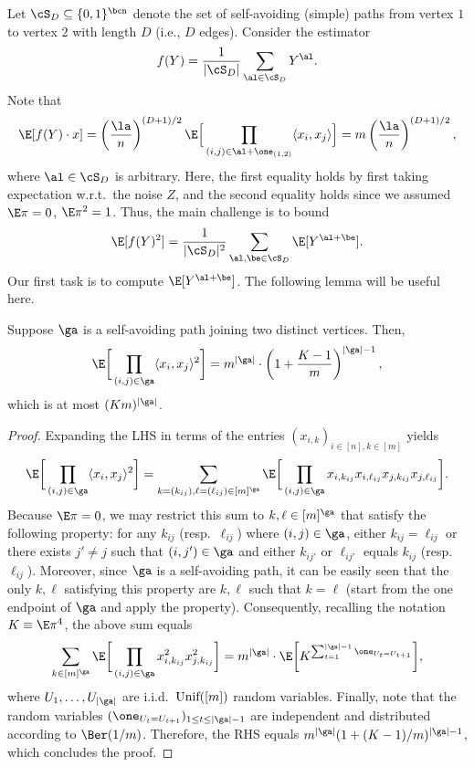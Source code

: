 \documentclass[11pt]{article}
\begin{document}
Let $\cS_D\subseteq \{0,1\}^{\bcn}$ denote the set of self-avoiding (simple) paths from vertex $1$ to vertex $2$ with length $D$ (i.e., $D$ edges). Consider the estimator
\begin{equation}\label{eq:f:saw}
f(Y)=\frac{1}{|\cS_D|}\sum_{\al \in \cS_D} Y^{\al}.
\end{equation}
Note that
\[
\E[f(Y)\cdot x]=\left(\frac{\la}{n}\right)^{(D+1)/2}\E\Big[\prod_{(i,j)\in \al+\one_{(1,2)}}\langle x_i,x_j\rangle\Big]=m\left(\frac{\la}{n}\right)^{(D+1)/2},
\]
where $\al\in \cS_D$ is arbitrary. Here, the first equality holds by first taking expectation w.r.t.\ the noise $Z$, and the second equality holds since we assumed $\E\pi=0$, $\E\pi^2=1$. Thus, the main challenge is to bound
\begin{equation}\label{eq:express:f:sec:mo}
\E[f(Y)^2]=\frac{1}{|\cS_D|^2}\sum_{\al,\be\in \cS_D} \E[Y^{\al+\be}].
\end{equation}
Our first task is to compute $\E[Y^{\al+\be}]$. The following lemma will be useful here.
\begin{lemma}\label{lem:compute:path}
Suppose $\ga$ is a self-avoiding path joining two distinct vertices. Then,
\[
\E\bigg[\prod_{(i,j)\in \ga}\langle x_i,x_j\rangle^2\bigg]=m^{|\ga|}\cdot \left(1+\frac{K-1}{m}\right)^{|\ga|-1},
\]
which is at most $(Km)^{|\ga|}$.
\end{lemma}
\begin{proof}
Expanding the LHS in terms of the entries $(x_{i,k})_{i \in [n], k \in [m]}$ yields
\[
\E\bigg[\prod_{(i,j)\in \ga}\langle x_i,x_j\rangle^2\bigg]=\sum_{k=(k_{ij}), \ell=(\ell_{ij})\in [m]^{\ga}}\E\bigg[\prod_{(i,j)\in \ga}x_{i,k_{ij}}x_{i,\ell_{ij}}x_{j,k_{ij}}x_{j,\ell_{ij}}\bigg].
\]
Because $\E \pi=0$, we may restrict this sum to $k,\ell \in [m]^{\ga}$ that satisfy the following property: for any $k_{ij}$ (resp.\ $\ell_{ij}$) where $(i,j)\in \ga$, either $k_{ij}=\ell_{ij}$ or there exists $j'\neq j$ such that $(i,j')\in \ga$ and either $k_{ij'}$ or $\ell_{ij'}$ equals $k_{ij}$ (resp.\ $\ell_{ij}$). Moreover, since $\ga$ is a self-avoiding path, it can be easily seen that the only $k,\ell$ satisfying this property are $k,\ell$ such that $k=\ell$ (start from the one endpoint of $\ga$ and apply the property). Consequently, recalling the notation $K\equiv \E \pi^4$, the above sum equals
\[
\sum_{k\in [m]^{\ga}}\E\bigg[\prod_{(i,j)\in \ga}x_{i,k_{ij}}^2 x_{j,k_{ij}}^2\bigg]=m^{|\ga|}\cdot \E\bigg[K^{\sum_{t=1}^{|\ga|-1}\one_{U_t=U_{t+1}}}\bigg],
\]
where $U_1,\ldots, U_{|\ga|}$ are i.i.d.\ $\textnormal{Unif}([m])$ random variables. Finally, note that the random variables $(\one_{U_t=U_{t+1}})_{1 \leq t\leq |\ga|-1}$ are independent and distributed according to $\Ber(1/m)$. Therefore, the RHS equals $m^{|\ga|}(1+(K-1)/m)^{|\ga|-1}$, which concludes the proof.
\end{proof}
\end{document}
